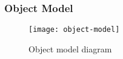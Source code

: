 \subsubsection{Object Model}
\begin{figure}[h]
\centering %
\texttt{[image: object-model]} %
\caption{Object model diagram}
\label{fig: object-model} %
\end{figure}
